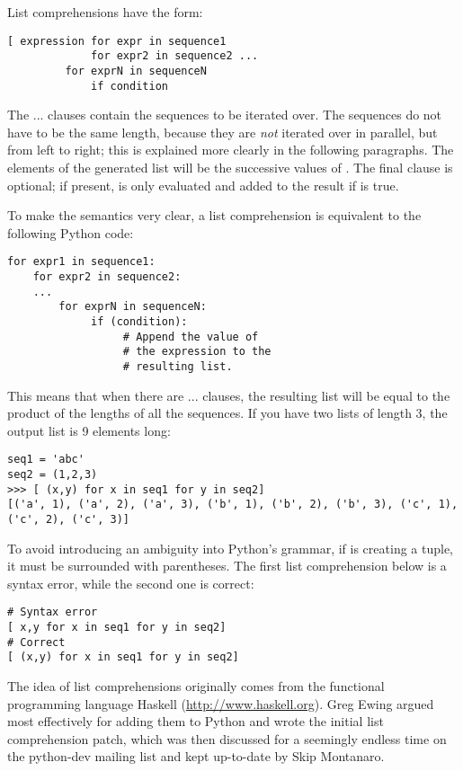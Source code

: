 \documentclass{howto}
\begin{document}
List comprehensions have the form:

\begin{verbatim}
[ expression for expr in sequence1 
             for expr2 in sequence2 ...
	     for exprN in sequenceN
             if condition
\end{verbatim}

The ... clauses contain the sequences to be
iterated over.  The sequences do not have to be the same length,
because they are \emph{not} iterated over in parallel, but
from left to right; this is explained more clearly in the following
paragraphs.  The elements of the generated list will be the successive
values of .  The final  clause is
optional; if present,  is only evaluated and added to
the result if  is true.

To make the semantics very clear, a list comprehension is equivalent
to the following Python code:

\begin{verbatim}
for expr1 in sequence1:
    for expr2 in sequence2:
    ...
        for exprN in sequenceN:
             if (condition):
                  # Append the value of 
                  # the expression to the 
                  # resulting list.
\end{verbatim}

This means that when there are ... clauses,
the resulting list will be equal to the product of the lengths of all
the sequences.  If you have two lists of length 3, the output list is
9 elements long:

\begin{verbatim}
seq1 = 'abc'
seq2 = (1,2,3)
>>> [ (x,y) for x in seq1 for y in seq2]
[('a', 1), ('a', 2), ('a', 3), ('b', 1), ('b', 2), ('b', 3), ('c', 1),
('c', 2), ('c', 3)]
\end{verbatim}

To avoid introducing an ambiguity into Python's grammar, if
 is creating a tuple, it must be surrounded with
parentheses.  The first list comprehension below is a syntax error,
while the second one is correct:

\begin{verbatim}
# Syntax error
[ x,y for x in seq1 for y in seq2]
# Correct
[ (x,y) for x in seq1 for y in seq2]
\end{verbatim}

The idea of list comprehensions originally comes from the functional
programming language Haskell (\url{http://www.haskell.org}).  Greg
Ewing argued most effectively for adding them to Python and wrote the
initial list comprehension patch, which was then discussed for a
seemingly endless time on the python-dev mailing list and kept
up-to-date by Skip Montanaro.
\end{document}
